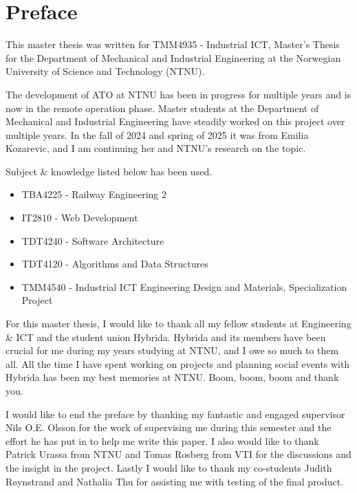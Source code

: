 \section*{Preface}
This master thesis was written for TMM4935 \-- Industrial ICT, Master's Thesis for the Department of Mechanical and Industrial Engineering at the Norwegian University of Science and Technology (NTNU).

The development of ATO at NTNU has been in progress for multiple years and is now in the remote operation phase. Master students at the Department of Mechanical and Industrial Engineering have steadily worked on this project over multiple years. In the fall of 2024 and spring of 2025 it was from Emilia Kozarevic, and I am continuing her and NTNU's research on the topic.

Subject \& knowledge listed below has been used.
\begin{itemize}
    \item TBA4225 \-- Railway Engineering 2
    \item IT2810  \-- Web Development
    \item TDT4240 \-- Software Architecture
    \item TDT4120 \-- Algorithms and Data Structures
    \item TMM4540 \-- Industrial ICT Engineering Design and Materials, Specialization Project
\end{itemize}

For this master thesis, I would like to thank all my fellow students at Engineering \& ICT and the student union Hybrida. Hybrida and its members have been crucial for me during my years studying at NTNU, and I owe so much to them all. All the time I have spent working on projects and planning social events with Hybrida has been my best memories at NTNU. Boom, boom, boom and thank you.

I would like to end the preface by thanking my fantastic and engaged supervisor Nils O.E. Olsson for the work of supervising me during this semester and the effort he has put in to help me write this paper. I also would like to thank Patrick Urassa from NTNU and Tomas Rosberg from VTI for the discussions and the insight in the project. Lastly I would like to thank my co-students Judith Røynstrand and Nathalia Thu for assisting me with testing of the final product.
